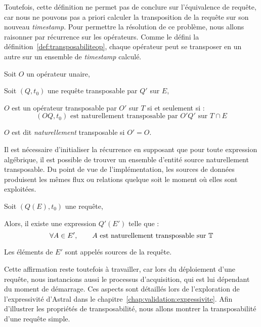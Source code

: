Toutefois, cette définition ne permet pas de conclure sur l'équivalence de requête, car nous ne pouvons pas a priori calculer la transposition de la requête sur son nouveau \textit{timestamp}. Pour permettre la résolution de ce problème, nous allons raisonner par récurrence sur les opérateurs. Comme le défini la définition~\ref{def:transposabiliteop}, chaque opérateur peut se transposer en un autre sur un ensemble de \textit{timestamp} calculé.
\begin{defi}\label{def:transposabiliteop}
    Soit $O$ un opérateur unaire,

    Soit $(Q,t_0)$ une requête transposable par $Q'$ sur $E$,

    $O$ est un opérateur transposable par $O'$ sur $T$ si et seulement si : $$(OQ,t_0) \textrm{ est naturellement transposable par } O'Q' \textrm{ sur } T\cap E$$

    $O$ est dit \textit{naturellement} transposable si $O'=O$.
\end{defi}

Il est nécessaire d'initialiser la récurrence en supposant que pour toute expression algébrique, il est possible de trouver un ensemble d'entité source naturellement transposable. Du point de vue de l'implémentation, les sources de données produisent les mêmes flux ou relations quelque soit le moment où elles sont exploitées.
\begin{hyp}\label{hyp:transposabilite}
    Soit $(Q(E),t_0)$ une requête,

    Alors, il existe une expression $Q'(E')$ telle que : $$\forall A\in E', \qquad A \textrm{ est naturellement transposable sur } \mathbb{T}$$
    
    Les éléments de $E'$ sont appelés sources de la requête.
\end{hyp}
Cette affirmation reste toutefois à travailler, car lors du déploiement d'une requête, nous instancions aussi le processus d'acquisition, qui est lui dépendant du moment de démarrage. Ces aspects sont détaillés lors de l'exploration de l'expressivité d'Astral dans le chapitre~\ref{chap:validation:expressivite}. Afin d'illustrer les propriétés de transposabilité, nous allons montrer la transposabilité d'une requête simple.

